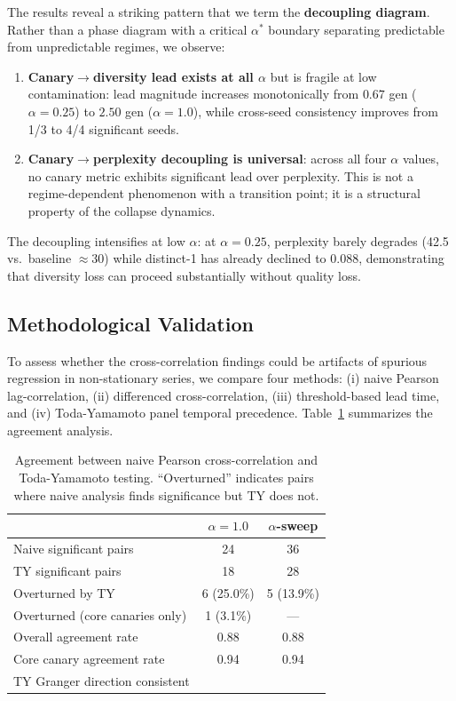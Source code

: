 \documentclass[letterpaper,11pt]{article}
\newcommand{\cmark}{\checkmark}
\begin{document}
The results reveal a striking pattern that we term the \textbf{decoupling diagram}.
Rather than a phase diagram with a critical $\alpha^*$ boundary separating predictable from unpredictable regimes, we observe:

\begin{enumerate}
    \item \textbf{Canary$\to$diversity lead exists at all $\alpha$} but is fragile at low contamination: lead magnitude increases monotonically from $0.67$ gen ($\alpha{=}0.25$) to $2.50$ gen ($\alpha{=}1.0$), while cross-seed consistency improves from 1/3 to 4/4 significant seeds.

    \item \textbf{Canary$\to$perplexity decoupling is universal}: across all four $\alpha$ values, no canary metric exhibits significant lead over perplexity.
    This is not a regime-dependent phenomenon with a transition point; it is a structural property of the collapse dynamics.
\end{enumerate}

The decoupling intensifies at low $\alpha$: at $\alpha{=}0.25$, perplexity barely degrades (42.5 vs.\ baseline $\approx 30$) while distinct-1 has already declined to 0.088, demonstrating that diversity loss can proceed substantially without quality loss.

\subsection{Methodological Validation}
\label{sec:method}

To assess whether the cross-correlation findings could be artifacts of spurious regression in non-stationary series, we compare four methods: (i) naive Pearson lag-correlation, (ii) differenced cross-correlation, (iii) threshold-based lead time, and (iv) Toda-Yamamoto panel temporal precedence.
Table~\ref{tab:method} summarizes the agreement analysis.

\begin{table}[t]
\centering
\caption{Agreement between naive Pearson cross-correlation and Toda-Yamamoto testing. ``Overturned'' indicates pairs where naive analysis finds significance but TY does not.}
\label{tab:method}
\small
\begin{tabular}{@{}lcc@{}}
\toprule
& $\alpha{=}1.0$ & $\alpha$-sweep \\
\midrule
Naive significant pairs & 24 & 36 \\
TY significant pairs & 18 & 28 \\
Overturned by TY & 6 (25.0\%) & 5 (13.9\%) \\
\midrule
Overturned (core canaries only) & 1 (3.1\%) & --- \\
Overall agreement rate & 0.88 & 0.88 \\
Core canary agreement rate & 0.94 & 0.94 \\
TY Granger direction consistent & \cmark & \cmark \\
\bottomrule
\end{tabular}
\end{table}
\end{document}
